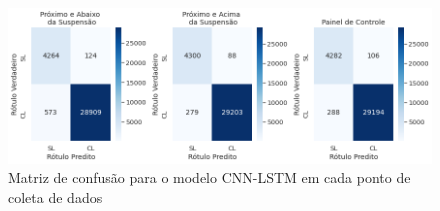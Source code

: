 \begin{figure}[H]
  \centering
  \caption{Matriz de confusão para o modelo CNN-LSTM em cada ponto de coleta de dados}
  \label{fig:cnn_lstm_confusion_matrix_lombadas}
  \includegraphics[width=1\textwidth]{figuras/fig_45.png}
\end{figure}

